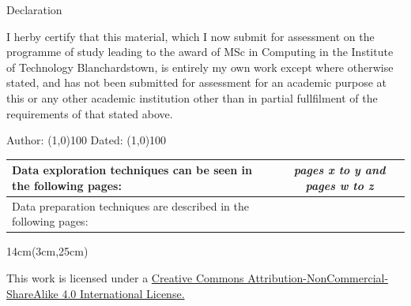 
\begin{declaration} %

\Large{Declaration}

 \vspace*{15mm}

\large
I herby certify that this material, which I now submit for assessment on the programme of study leading to the award of MSc in Computing in the Institute of Technology Blanchardstown, is entirely my own work except where otherwise stated, and has not been submitted for assessment for an academic purpose at this or any other academic institution other than in partial fullfilment of the requirements of that stated above. 

 \vspace*{15mm}
Author: \line(1,0){100}  \hspace*{15mm} Dated: \line(1,0){100}

 \vspace*{25mm}

\begin{table} [h]    %
\centering

\begin{tabular}{| p{7cm} | c |}\\   
\toprule
Data exploration techniques can be seen in the following pages: &  \emph{pages x to y and pages  w to z } \\
\midrule
Data preparation techniques are described in the following pages:  &     \\
\bottomrule
\end{tabular}
\end{table}	


\begin{textblock*}{14cm}(3cm,25cm) %

\cc   This work is licensed under a \href{http://creativecommons.org/licenses/by-nc-sa/4.0/}{Creative Commons Attribution-NonCommercial-ShareAlike 4.0 International License.}
\end{textblock*}


\end{declaration}


